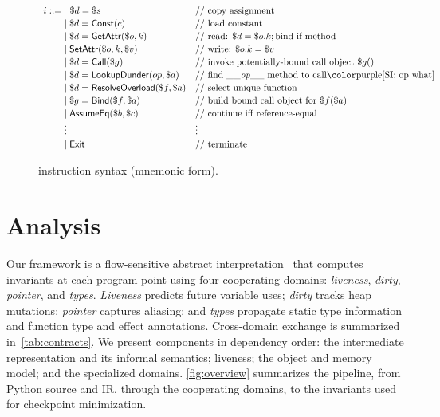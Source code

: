 
\begin{figure}[t]
\centering
\[
\renewcommand{\arraystretch}{1.15}
\begin{array}{l@{}ll}
i ::= \;&\hspace{6pt} \$d = \$s & \text{// copy assignment} \\
      &\mid \$d = \mathsf{Const}(c) & \text{// load constant} \\
      &\mid \$d = \mathsf{GetAttr}(\$o, k) & \text{// read: } \$d = \$o.k; \text{bind if method} \\
      &\mid \mathsf{SetAttr}(\$o, k, \$v) & \text{// write: } \$o.k = \$v \\
      &\mid \$d = \mathsf{Call}(\$g) & \text{// invoke potentially-bound call object } \$g() \\
      &\mid \$d = \mathsf{LookupDunder}(op, \$a)  & \text{// find \_\_\textit{op}\_\_ method to call\si{op what}} \\
      &\mid \$d = \mathsf{ResolveOverload}(\$f, \$a) & \text{// select unique function} \\
      &\mid \$g = \mathsf{Bind}(\$f, \$a) & \text{// build bound call object for } \$f(\$a) \\
      &\mid \mathsf{AssumeEq}(\$b, \$c) & \text{// continue iff reference-equal} \\
      & \vdots & \vdots \\
      &\mid \mathsf{Exit} & \text{// terminate}
\end{array}
\]
\caption{\spytecode instruction syntax (mnemonic form).}
\label{fig:tac-syntax-reduced}
\end{figure}

\section{Analysis}
\label{sec:analysis}

Our framework is a flow-sensitive abstract interpretation~\cite{cousot1977abstract} that computes invariants at each program point using four cooperating domains: \emph{liveness}, \emph{dirty}, \emph{pointer}, and \emph{types}. \emph{Liveness} predicts future variable uses; \emph{dirty} tracks heap mutations; \emph{pointer} captures aliasing; and \emph{types} propagate static type information and function type and effect annotations. Cross-domain exchange is summarized in~\autoref{tab:contracts}. We present components in dependency order: the intermediate representation and its informal semantics; liveness; the object and memory model; and the specialized domains. \autoref{fig:overview} summarizes the pipeline, from Python source and IR, through the cooperating domains, to the invariants used for checkpoint minimization.

